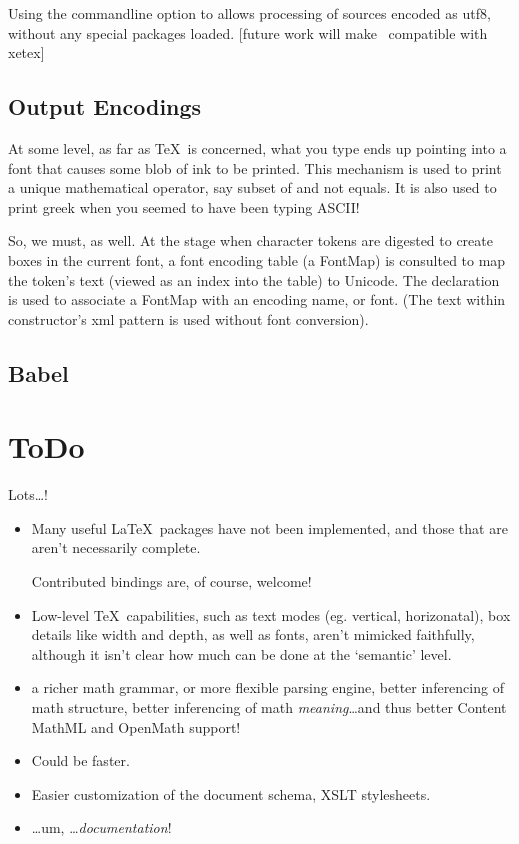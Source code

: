 \documentclass{book}
\begin{document}
Using the commandline option  to  allows
processing of sources encoded as utf8, without any special packages loaded.
[future work will make \LaTeXML\ compatible with xetex]

\section{Output Encodings}\label{localization.outputencodings}
At some level, as far as \TeX\ is concerned, what you type ends up pointing into a font
that causes some blob of ink to be printed. This mechanism is used to print
a unique mathematical operator, say subset of and not equals.  It is also used
to print greek when you seemed to have been typing ASCII!

So, we must, as well. At the stage when character tokens are digested to create boxes
in the current font, a font encoding table (a FontMap) is consulted to map the token's text (viewed as an
index into the table) to Unicode.  The declaration  is used to associate
a FontMap with an encoding name, or font. (The text within constructor's xml pattern is used without font conversion).

\section{Babel}\label{localization.babel}

\chapter{ToDo}\label{todo}
Lots\ldots!
\begin{itemize}
\item Many useful \LaTeX\ packages have not been implemented, and those
  that are aren't necessarily complete.

  Contributed bindings are, of course, welcome!
\item Low-level \TeX\ capabilities, such as text modes (eg. vertical, horizonatal),
 box details like width and depth, as well as fonts,  aren't mimicked faithfully,
  although it isn't clear how much can be done at the `semantic' level.
\item a richer math grammar, or more flexible parsing engine,
  better inferencing of math structure,
  better inferencing of math \emph{meaning}\ldots and thus better
  Content MathML and OpenMath support!
\item Could be faster.
\item Easier customization of the document schema, XSLT stylesheets.
\item \ldots um, \ldots \emph{documentation}!
\end{itemize}
\end{document}
